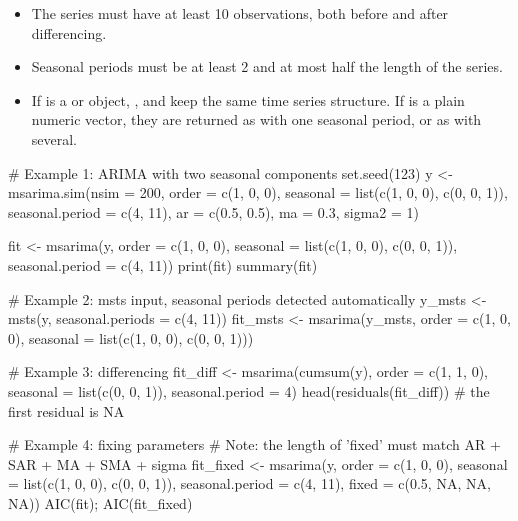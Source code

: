 \documentclass[a4paper]{book}
\begin{document}
%
\begin{Note}
\begin{itemize}

\item{} The series must have at least 10 observations, both before and after differencing.
\item{} Seasonal periods must be at least 2 and at most half the length of the series.
\item{} If  is a  or  object, ,  and
 keep the same time series structure. If  is a plain numeric
vector, they are returned as  with one seasonal period, or as 
with several.

\end{itemize}

\end{Note}
%
\begin{Examples}
\begin{ExampleCode}
# Example 1: ARIMA with two seasonal components
set.seed(123)
y <- msarima.sim(nsim = 200,
                 order = c(1, 0, 0),
                 seasonal = list(c(1, 0, 0), c(0, 0, 1)),
                 seasonal.period = c(4, 11),
                 ar = c(0.5, 0.5), ma = 0.3, sigma2 = 1)

fit <- msarima(y, order = c(1, 0, 0),
               seasonal = list(c(1, 0, 0), c(0, 0, 1)),
               seasonal.period = c(4, 11))
print(fit)
summary(fit)

# Example 2: msts input, seasonal periods detected automatically
y_msts <- msts(y, seasonal.periods = c(4, 11))
fit_msts <- msarima(y_msts, order = c(1, 0, 0),
                    seasonal = list(c(1, 0, 0), c(0, 0, 1)))

# Example 3: differencing
fit_diff <- msarima(cumsum(y), order = c(1, 1, 0),
                    seasonal = list(c(0, 0, 1)),
                    seasonal.period = 4)
head(residuals(fit_diff))  # the first residual is NA

# Example 4: fixing parameters
# Note: the length of 'fixed' must match AR + SAR + MA + SMA + sigma
fit_fixed <- msarima(y, order = c(1, 0, 0),
                     seasonal = list(c(1, 0, 0), c(0, 0, 1)),
                     seasonal.period = c(4, 11),
                     fixed = c(0.5, NA, NA, NA))
AIC(fit); AIC(fit_fixed)

\end{ExampleCode}
\end{Examples}
\end{document}
